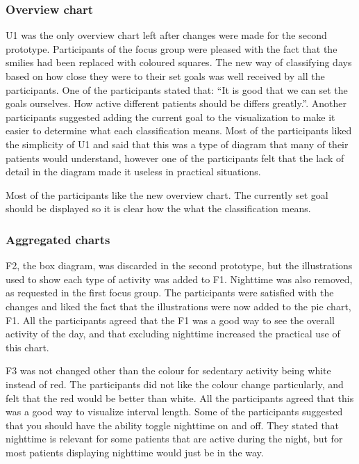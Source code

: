 \subsubsection{Overview chart}
U1 was the only overview chart left after changes were made for the second prototype. Participants of the focus group were pleased with the fact that the smilies had been replaced with coloured squares. The new way of classifying days based on how close they were to their set goals was well received by all the participants. One of the participants stated that: ``It is good that we can set the goals ourselves. How active different patients should be differs greatly.''. Another participants suggested adding the current goal to the visualization to make it easier to determine what each classification means. Most of the participants liked the simplicity of U1 and said that this was a type of diagram that many of their patients would understand, however one of the participants felt that the lack of detail in the diagram made it useless in practical situations.

Most of the participants like the new overview chart. The currently set goal should be displayed so it is clear how the what the classification means.

\subsubsection{Aggregated charts}
F2, the box diagram, was discarded in the second prototype, but the illustrations used to show each type of activity was added to F1. Nighttime was also removed, as requested in the first focus group. The participants were satisfied with the changes and liked the fact that the illustrations were now added to the pie chart, F1. All the participants agreed that the F1 was a good way to see the overall activity of the day, and that excluding nighttime increased the practical use of this chart.

F3 was not changed other than the colour for sedentary activity being white instead of red. The participants did not like the colour change particularly, and felt that the red would be better than white. All the participants agreed that this was a good way to visualize interval length. Some of the participants suggested that you should have the ability toggle nighttime on and off. They stated that nighttime is relevant for some patients that are active during the night, but for most patients displaying nighttime would just be in the way.

